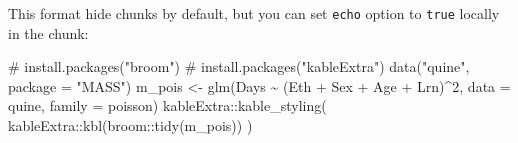 \documentclass[
]{article}
\newenvironment{Shaded}{\begin{snugshade}}{\end{snugshade}}
\newcommand{\AttributeTok}[1]{\textcolor[rgb]{0.40,0.45,0.13}{#1}}
\newcommand{\CommentTok}[1]{\textcolor[rgb]{0.37,0.37,0.37}{#1}}
\newcommand{\DecValTok}[1]{\textcolor[rgb]{0.68,0.00,0.00}{#1}}
\newcommand{\FunctionTok}[1]{\textcolor[rgb]{0.28,0.35,0.67}{#1}}
\newcommand{\NormalTok}[1]{\textcolor[rgb]{0.00,0.23,0.31}{#1}}
\newcommand{\OtherTok}[1]{\textcolor[rgb]{0.00,0.23,0.31}{#1}}
\newcommand{\SpecialCharTok}[1]{\textcolor[rgb]{0.37,0.37,0.37}{#1}}
\newcommand{\StringTok}[1]{\textcolor[rgb]{0.13,0.47,0.30}{#1}}
\begin{document}
This format hide chunks by default, but you can set \texttt{echo} option
to \texttt{true} locally in the chunk:

\begin{Shaded}
\begin{Highlighting}[]
\CommentTok{\# install.packages("broom")}
\CommentTok{\# install.packages("kableExtra")}
\FunctionTok{data}\NormalTok{(}\StringTok{"quine"}\NormalTok{, }\AttributeTok{package =} \StringTok{"MASS"}\NormalTok{)}
\NormalTok{m\_pois }\OtherTok{\textless{}{-}} \FunctionTok{glm}\NormalTok{(Days }\SpecialCharTok{\textasciitilde{}}\NormalTok{ (Eth }\SpecialCharTok{+}\NormalTok{ Sex }\SpecialCharTok{+}\NormalTok{ Age }\SpecialCharTok{+}\NormalTok{ Lrn)}\SpecialCharTok{\^{}}\DecValTok{2}\NormalTok{, }\AttributeTok{data =}\NormalTok{ quine, }\AttributeTok{family =}\NormalTok{ poisson)}
\NormalTok{kableExtra}\SpecialCharTok{::}\FunctionTok{kable\_styling}\NormalTok{(}
\NormalTok{  kableExtra}\SpecialCharTok{::}\FunctionTok{kbl}\NormalTok{(broom}\SpecialCharTok{::}\FunctionTok{tidy}\NormalTok{(m\_pois))}
\NormalTok{)}
\end{Highlighting}
\end{Shaded}
\end{document}
